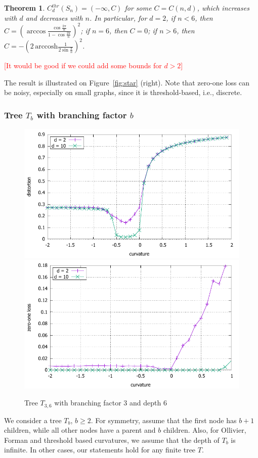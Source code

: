\documentclass{article} %
\newtheorem{theorem}{Theorem}[section]
\begin{document}
\begin{theorem}\label{thm:star_threshold}
$C_d^{thr}(S_n) = (-\infty, C)$ for some $C = C(n,d)$, which increases with $d$ and decreases with $n$. In particular, for $d = 2$, if $n < 6$, then $C = \left(\arccos \frac{\cos \frac{2\pi}{n}}{1 - \cos \frac{2\pi}{n}}\right)^2$; if $n = 6$, then $C = 0$; if $n > 6$, then $C = - \left(2\,\mathrm{arccosh}\frac{1}{2\sin \frac{\pi}{n}}\right)^2$.
\end{theorem}

\textcolor{red}{[It would be good if we could add some bounds for $d > 2$]}

The result is illustrated on Figure~\ref{fig:star} (right). Note that zero-one loss can be noisy, especially on small graphs, since it is threshold-based, i.e., discrete.

\subsubsection{Tree $T_b$ with branching factor $b$}

\begin{figure}
    \centering
    \includegraphics[width = 0.49 \textwidth]{tree_3_6_distortion.pdf}
    \includegraphics[width = 0.49 \textwidth]{tree_3_6_zero_one.pdf}
    \caption{Tree $T_{3,6}$ with branching factor $3$ and depth $6$}
    \label{fig:tree}
\end{figure}

We consider a tree $T_b$, $b \ge 2$. For symmetry, assume that the first node has $b+1$ children, while all other nodes have a parent and $b$ children. Also, for Ollivier, Forman and threshold based curvatures, we assume that the depth of $T_b$ is infinite. In other cases, our statements hold for any finite tree $T$.
\end{document}
